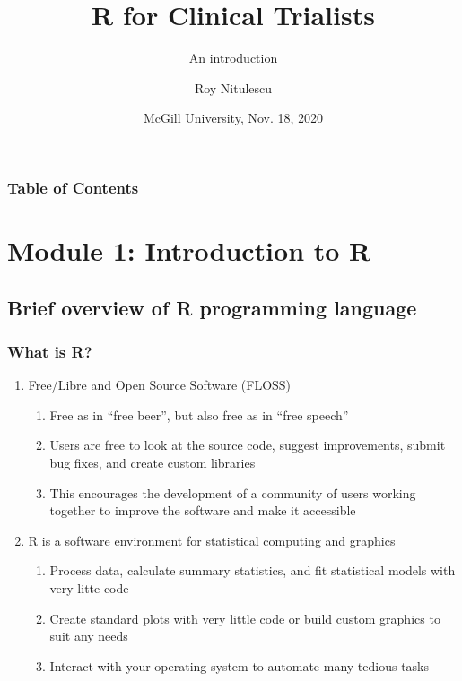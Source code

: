\documentclass{beamer}
\title{R for Clinical Trialists}
\subtitle{An introduction}
\author{Roy Nitulescu\inst{1}}
\institute
{
    \inst{1}%
    CITADEL\\
    CR-CHUM
}
\date{McGill University, Nov. 18, 2020}
\begin{document}

\frame{\titlepage}

\begin{frame}
    \frametitle{Table of Contents}
    \tableofcontents
\end{frame}



\section{Module 1: Introduction to R}

\subsection{Brief overview of R programming language}

\begin{frame}
    \frametitle{What is R?}
    \begin{enumerate}
      \item Free/Libre and Open Source Software (FLOSS)
      \begin{enumerate}
        \item Free as in ``free beer'', but also free as in ``free speech''
        \item Users are free to look at the source code, suggest improvements, submit bug fixes, and create custom libraries
        \item This encourages the development of a community of users working together to improve the software and make it accessible
      \end{enumerate}
      \item R is a software environment for statistical computing and graphics
      \begin{enumerate}
        \item Process data, calculate summary statistics, and fit statistical models with very litte code
        \item Create standard plots with very little code or build custom graphics to suit any needs
        \item Interact with your operating system to automate many tedious tasks
      \end{enumerate}
    \end{enumerate}
\end{frame}
\end{document}
